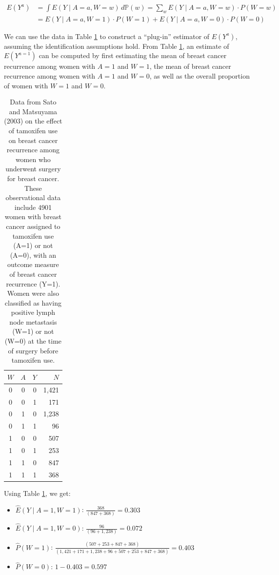 \documentclass[12pt]{article}
\numberwithin{equation}{section}
\begin{document}
\begin{align*}
E(Y^{a}) & = \int E(Y \mid A = a, W = w)\,d\mathbb{P}(w) = \sum_w E(Y \mid A = a, W = w)\cdot P(W = w)\\
         & = E(Y \mid A = a, W = 1)\cdot P(W = 1) +  E(Y \mid A = a, W = 0)\cdot P(W=0)
\end{align*}

We can use the data in Table \ref{tab:tamoxifen_data} to construct a ``plug-in'' estimator of $E(Y^{a})$, assuming the identification assumptions hold. From Table \ref{tab:tamoxifen_data}, an estimate of $E(Y^{a=1})$ can be computed by first estimating the mean of breast cancer recurrence among women with $A = 1$ and $W = 1$, the mean of breast cancer recurrence among women with $A = 1$ and $W = 0$, as well as the overall proportion of women with $W = 1$ and $W = 0$. 

\begin{table}[h]
\centering
\begin{tabular}{ccrr}
\toprule
$W$ & $A$ & $Y$ & $N$ \\
\midrule
0 & 0 & 0 & 1{,}421 \\
0 & 0 & 1 &    171 \\
0 & 1 & 0 & 1{,}238 \\
0 & 1 & 1 &     96 \\
1 & 0 & 0 &    507 \\
1 & 0 & 1 &    253 \\
1 & 1 & 0 &    847 \\
1 & 1 & 1 &    368 \\
\bottomrule
\end{tabular}
\caption{Data from Sato and Matsuyama (2003) on the effect of tamoxifen use on breast cancer recurrence among women who underwent surgery for breast cancer. These observational data include 4901 women with breast cancer assigned to tamoxifen use (A=1) or not (A=0), with an outcome measure of breast cancer recurrence (Y=1). Women were also classified as having positive lymph node metastasis (W=1) or not (W=0) at the time of surgery before tamoxifen use.}
\label{tab:tamoxifen_data}
\end{table}

\newpage

Using Table \ref{tab:tamoxifen_data}, we get:

\begin{itemize}
	\item[] $\hat{E}(Y \mid A = 1, W = 1)$: $\frac{368}{(847+368)} = 0.303$
	\item[] $\hat{E}(Y \mid A = 1, W = 0)$: $\frac{96}{(96+1,238)} = 0.072$
	\item[] $\hat{P}(W = 1)$: $\frac{(507+253+847+368)}{(1,421+171+1,238+96+507+253+847+368)} = 0.403$
	\item[] $\hat{P}(W = 0)$: $1 - 0.403 = 0.597 $
\end{itemize}
\end{document}

